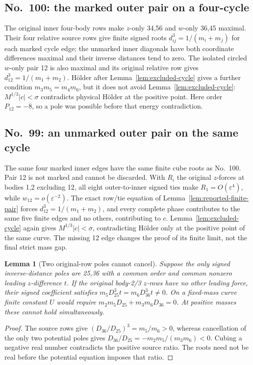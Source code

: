 \documentclass[11pt]{amsart}
\newtheorem{lemma}[theorem]{Lemma}
\theoremstyle{remark}
\begin{document}
\subsection{No.~100: the marked outer pair on a four-cycle}\label{sec:no100-cycle}
The original inner four-body rows make $z$-only 34,56 and $w$-only 36,45 maximal. Their four relative source rows give finite signed roots $d_{ij}^3=1/(m_i+m_j)$ for each marked cycle edge; the unmarked inner diagonals have both coordinate differences maximal and their inverse distances tend to zero. The isolated circled $w$-only pair 12 is also maximal and its original relative row gives $d_{12}^3=1/(m_1+m_2)$. H\"older after Lemma~\ref{lem:excluded-cycle} gives a further condition $m_3m_5=m_4m_6$, but it does not avoid Lemma~\ref{lem:excluded-cycle}: $M^{1/3}|c|<\sigma$ contradicts physical H\"older at the positive point. Here order $P_{12}=-8$, so a pole was possible before that energy contradiction.

\subsection{No.~99: an unmarked outer pair on the same cycle}\label{sec:no99-cycle}
The same four marked inner edges have the same finite cube roots as No.~100. Pair 12 is not marked and cannot be discarded. With $R_i$ the original $z$-forces at bodies 1,2 excluding 12, all eight outer-to-inner signed ties make $R_1=O(\varepsilon^4)$, while $w_{12}=o(\varepsilon^{-2})$. The exact row/tie equation of Lemma~\ref{lem:reported-finite-pair} forces $d_{12}^3=1/(m_1+m_2)$, and every complete phase contributes to the same five finite edges and no others, contributing to $c$. Lemma~\ref{lem:excluded-cycle} again gives $M^{1/3}|c|<\sigma$, contradicting H\"older only at the positive point of the same curve. The missing 12 edge changes the proof of its finite limit, not the final strict mass gap.

\begin{lemma}[Two original-row poles cannot cancel]\label{lem:excluded-two-poles}
Suppose the only signed inverse-distance poles are 25,36 with a common order and common nonzero leading $z$-difference $t$. If the original body-2/3 $z$-rows have no other leading force, their signed coefficient satisfies $m_5D_{25}^3t=m_6D_{36}^3t\ne0$. On a fixed-mass curve finite constant $U$ would require $m_2m_5D_{25}+m_3m_6D_{36}=0$. At positive masses these cannot hold simultaneously.
\end{lemma}
\begin{proof}
The source rows give $(D_{36}/D_{25})^3=m_5/m_6>0$, whereas cancellation of the only two potential poles gives $D_{36}/D_{25}=-m_2m_5/(m_3m_6)<0$. Cubing a negative real number contradicts the positive source ratio. The roots need not be real before the potential equation imposes that ratio.
\end{proof}
\end{document}
